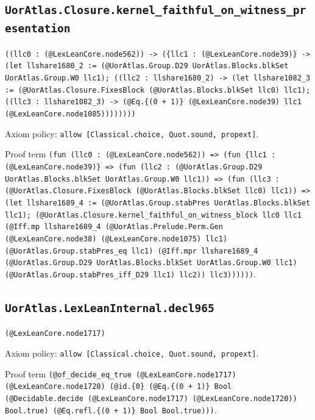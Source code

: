 \documentclass[11pt]{article}
\begin{document}
\subsection*{\texttt{UorAtlas.Closure.kernel\_faithful\_on\_witness\_presentation}}
\noindent\texttt{((llc0 : (@LexLeanCore.node562)) -> (\{llc1 : (@LexLeanCore.node39)\} -> (let llshare1680\_2 := (@UorAtlas.Group.D29 UorAtlas.Blocks.blkSet UorAtlas.Group.W0 llc1); ((llc2 : llshare1680\_2) -> (let llshare1082\_3 := (@UorAtlas.Closure.FixesBlock (@UorAtlas.Blocks.blkSet llc0) llc1); ((llc3 : llshare1082\_3) -> (@Eq.\{(0 + 1)\} (@LexLeanCore.node39) llc1 (@LexLeanCore.node1085))))))))}\par
\noindent Axiom policy: \texttt{allow [Classical.choice, Quot.sound, propext]}.\par
\noindent Proof term \texttt{(fun (llc0 : (@LexLeanCore.node562)) => (fun \{llc1 : (@LexLeanCore.node39)\} => (fun (llc2 : (@UorAtlas.Group.D29 UorAtlas.Blocks.blkSet UorAtlas.Group.W0 llc1)) => (fun (llc3 : (@UorAtlas.Closure.FixesBlock (@UorAtlas.Blocks.blkSet llc0) llc1)) => (let llshare1689\_4 := (@UorAtlas.Group.stabPres UorAtlas.Blocks.blkSet llc1); (@UorAtlas.Closure.kernel\_faithful\_on\_witness\_block llc0 llc1 (@Iff.mp llshare1689\_4 (@UorAtlas.Prelude.Perm.Gen (@LexLeanCore.node38) (@LexLeanCore.node1075) llc1) (@UorAtlas.Group.stabPres\_eq llc1) (@Iff.mpr llshare1689\_4 (@UorAtlas.Group.D29 UorAtlas.Blocks.blkSet UorAtlas.Group.W0 llc1) (@UorAtlas.Group.stabPres\_iff\_D29 llc1) llc2)) llc3))))))}.\par
\subsection*{\texttt{UorAtlas.LexLeanInternal.decl965}}
\noindent\texttt{(@LexLeanCore.node1717)}\par
\noindent Axiom policy: \texttt{allow [Classical.choice, Quot.sound, propext]}.\par
\noindent Proof term \texttt{(@of\_decide\_eq\_true (@LexLeanCore.node1717) (@LexLeanCore.node1720) (@id.\{0\} (@Eq.\{(0 + 1)\} Bool (@Decidable.decide (@LexLeanCore.node1717) (@LexLeanCore.node1720)) Bool.true) (@Eq.refl.\{(0 + 1)\} Bool Bool.true)))}.\par
\end{document}
